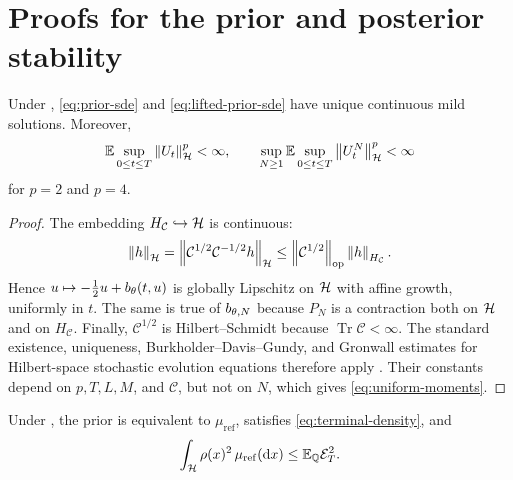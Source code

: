 \section{Proofs for the prior and posterior stability}
\label{sec:appendix-prior}

\begin{lemma}
\label{lem:sde-moments}
Under , \eqref{eq:prior-sde} and
\eqref{eq:lifted-prior-sde} have unique continuous mild solutions.
Moreover,
\begin{equation}
  \mathbb E\sup_{0\leq t\leq T}\left\lVert U_t\right\rVert_{\mathcal{H}}^p<\infty,
  \qquad
  \sup_{N\geq1}
  \mathbb E\sup_{0\leq t\leq T}\left\lVert U_t^N\right\rVert_{\mathcal{H}}^p<\infty
  \label{eq:uniform-moments}
\end{equation}
for $p=2$ and $p=4$.
\end{lemma}

\begin{proof}
The embedding $H_{\mathcal C}\hookrightarrow\mathcal{H}$ is continuous:
\[
  \left\lVert h\right\rVert_{\mathcal{H}}
  =\left\lVert\mathcal C^{1/2}\mathcal C^{-1/2}h\right\rVert_{\mathcal{H}}
  \leq\left\lVert\mathcal C^{1/2}\right\rVert_{\mathrm{op}}
       \left\lVert h\right\rVert_{H_{\mathcal C}}.
\]
Hence $u\mapsto-\tfrac12u+{b_{\theta}}(t,u)$ is globally Lipschitz on
$\mathcal{H}$ with affine growth, uniformly in $t$.  The same is true of
${b_{\theta,N}}$ because $P_N$ is a contraction both on $\mathcal{H}$ and on
$H_{\mathcal C}$.  Finally,
$\mathcal C^{1/2}$ is Hilbert--Schmidt because
$\operatorname{Tr}\mathcal C<\infty$.  The standard existence,
uniqueness, Burkholder--Davis--Gundy, and Gronwall estimates for
Hilbert-space stochastic evolution equations therefore apply
\citep{daprato1992}.  Their constants depend on $p,T,L,M$, and
$\mathcal C$, but not on $N$, which gives
\eqref{eq:uniform-moments}.
\end{proof}

\begin{lemma}
\label{lem:girsanov-terminal}
Under , the prior is equivalent to
$\mu_{\mathrm{ref}}$, satisfies \eqref{eq:terminal-density}, and
\begin{equation}
  \int_{\mathcal{H}}\rho(x)^2\,\mu_{\mathrm{ref}}(\mathrm dx)
  \leq\mathbb E_{\mathbb Q}\mathcal E_T^2.
  \label{eq:terminal-density-l2}
\end{equation}
\end{lemma}

